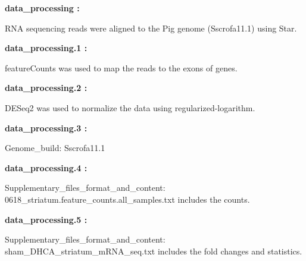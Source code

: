 \documentclass[
]{article}
\begin{document}
\begin{center}\begin{tcolorbox}[colback=gray!10, colframe=gray!50, width=0.9\linewidth, arc=1mm, boxrule=0.5pt]
\textbf{
data\_processing
:}

\vspace{0.5em}

    RNA sequencing reads were aligned to the Pig genome
(Sscrofa11.1) using Star.

\vspace{2em}


\textbf{
data\_processing.1
:}

\vspace{0.5em}

    featureCounts was used to map the reads to the exons of
genes.

\vspace{2em}


\textbf{
data\_processing.2
:}

\vspace{0.5em}

    DESeq2 was used to normalize the data using
regularized-logarithm.

\vspace{2em}


\textbf{
data\_processing.3
:}

\vspace{0.5em}

    Genome\_build: Sscrofa11.1

\vspace{2em}


\textbf{
data\_processing.4
:}

\vspace{0.5em}

    Supplementary\_files\_format\_and\_content:
0618\_striatum.feature\_counts.all\_samples.txt includes the
counts.

\vspace{2em}


\textbf{
data\_processing.5
:}

\vspace{0.5em}

    Supplementary\_files\_format\_and\_content:
sham\_DHCA\_striatum\_mRNA\_seq.txt includes the fold changes
and statistics.

\vspace{2em}
\end{tcolorbox}
\end{center}
\end{document}
